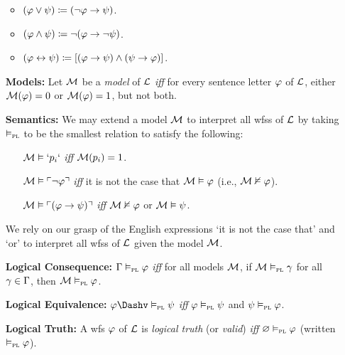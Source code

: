 \documentclass[a4paper, 11pt]{article} %
\begin{document}
\begin{enumerate}[leftmargin=1.2in,labelsep=.15in]
    \begin{itemize}\small
      \item $(\varphi \vee \psi) \coloneq (\neg \varphi \rightarrow \psi)$.
      \item $(\varphi\wedge \psi) \coloneq \neg(\varphi \rightarrow \neg\psi)$.
      \item $(\varphi\leftrightarrow \psi) \coloneq [(\varphi\rightarrow \psi)\wedge(\psi\rightarrow \varphi)]$.
    \end{itemize}
  \item[\bf Models:] Let $\mathcal{M}$ be a \textit{model} of $\mathcal{L}$ \textit{iff} for every sentence letter $\varphi$ of $\mathcal{L}$, either $\mathcal{M}(\varphi)=0$ or $\mathcal{M}(\varphi)=1$, but not both.
  \item[\bf Semantics:] We may extend a model $\mathcal{M}$ to interpret all wfss of $\mathcal{L}$ by taking $\vDash_{\textsc{pl}}$ to be the smallest relation to satisfy the following:
  \begin{itemize}[leftmargin=.15in]\small
  \item[] $\mathcal{M}\vDash `p_i`$ \textit{iff} $\mathcal{M}(p_i)=1$.
  \item[] $\mathcal{M}\vDash \ulcorner\neg \varphi\urcorner$ \textit{iff} it is not the case that $\mathcal{M}\vDash \varphi$ (i.e., $\mathcal{M}\nvDash \varphi$). %
  \item[] $\mathcal{M}\vDash \ulcorner(\varphi \rightarrow \psi)\urcorner$ \textit{iff} $\mathcal{M}\nvDash \varphi$ or $\mathcal{M}\vDash \psi$.
  \end{itemize}
  We rely on our grasp of the English expressions `it is not the case that' and `or' to interpret all wfss of $\mathcal{L}$ given the model $\mathcal{M}$. 
  \item[\bf Logical Consequence:] $\Gamma \vDash_{\textsc{pl}} \varphi$ \textit{iff} for all models $\mathcal{M}$, if $\mathcal{M}\vDash_{\textsc{pl}} \gamma$ for all $\gamma\in\Gamma$, then $\mathcal{M}\vDash_{\textsc{pl}} \varphi$.
  \item[\bf Logical Equivalence:] $\metaA \Dashv\PLmodels \metaB$ \textit{iff} $\varphi\vDash_{\textsc{pl}} \psi$ and $\psi\vDash_{\textsc{pl}} \varphi$.  
  \item[\bf Logical Truth:] A wfs $\varphi$ of $\mathcal{L}$ is \textit{logical truth} (or \textit{valid}) \textit{iff} $\varnothing\vDash_{\textsc{pl}} \varphi$ (written $\vDash_{\textsc{pl}} \varphi$).
\end{enumerate}
\end{document}
